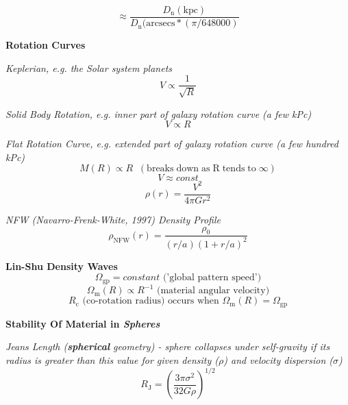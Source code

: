 \documentclass{article}
\begin{document}
\begin{equation}
\approx \frac{D_\mathrm{n}(\mathrm{kpc})}{D_\mathrm{n}(\mathrm{arcsecs} * (\pi / 648000)}
\end{equation}




\textbf {Rotation Curves}

\textit {Keplerian, e.g. the Solar system planets}
\begin{equation}
V \propto \frac {1}{\sqrt{R}}
\end{equation}

\textit {Solid Body Rotation, e.g. inner part of galaxy rotation curve (a few kPc)}
\begin{equation}
V \propto R
\end{equation}

\textit {Flat Rotation Curve, e.g. extended part of galaxy rotation curve (a few hundred kPc)}
\begin{equation}
M(R) \propto R \; \; (\mathrm{breaks \; down \; as \; R \; tends \; to \;} \infty)
\end{equation}
\begin{equation}
V \approx const
\end{equation}
\begin{equation}
\rho(r) = \frac {V^2}{4 \pi G r^2}
\end{equation}

\textit {NFW (Navarro-Frenk-White, 1997) Density Profile}
\begin{equation}
\rho_\mathrm{NFW}(r) = \frac {\rho_\mathrm{0}}{(r/a)(1 + r/a)^2}  
\end{equation}

\textbf{Lin-Shu Density Waves}
\begin{equation}
\Omega_\mathrm{gp} = constant \text{ ('global pattern speed')}
\end{equation}
\begin{equation}
\Omega_\mathrm{m}(R) \propto R^{-1} \text{ (material angular velocity)}
\end{equation}
\begin{equation}
R_\mathrm{c}  \text{ (co-rotation radius) occurs when } \Omega_\mathrm{m}(R) = \Omega_\mathrm{gp}
\end{equation}

\textbf {Stability Of Material in \textit{Spheres}}

\textit {Jeans Length  (\textbf{spherical} geometry) - sphere collapses under self-gravity if its radius is greater than this value for given density (\(\rho\)) and velocity dispersion (\(\sigma\)) }
\begin{equation}
R_\mathrm{J} = \left( \frac{3 \pi \sigma^2}{32 G \rho} \right)^{1/2}
\end{equation}
\end{document}
